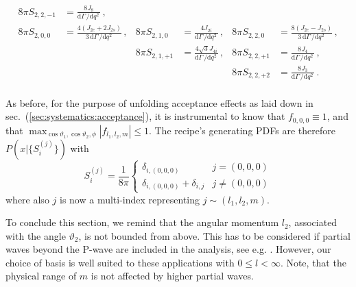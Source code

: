 \documentclass[aps,nofootinbib,preprintnumbers,prd,twocolumn]{revtex4-1}
\newcommand{\refsec}[1]{sec.~(\ref{sec:#1})}
\newcommand{\rmdx}[1]{\mbox{d} #1 \,} %
\renewcommand{\theta}{\vartheta}
\begin{document}
\begin{widetext}
\begin{equation}
\begin{aligned}
    8\pi S_{2, 2, -1} & = \frac{8 J_8}{\rmdx{\Gamma}/\rmdx{q^2}}\,,                                        \\
%
    8\pi S_{2, 0,  0} & = \frac{4 (J_{2c} + 2 J_{2s})}{3\, \rmdx{\Gamma}/\rmdx{q^2}}\,,                    &
    8\pi S_{2, 1,  0} & = \frac{4 J_{2i}}{\rmdx{\Gamma}/\rmdx{q^2}}\,,                                     &
    8\pi S_{2, 2,  0} & = \frac{8 (J_{2c} - J_{2s})}{3\, \rmdx{\Gamma}/\rmdx{q^2}}\,,                      \\
%
                      &                                                                                    &
    8\pi S_{2, 1, +1} & = \frac{4\sqrt{3} J_{4i}}{\rmdx{\Gamma}/\rmdx{q^2}}\,,                             &
    8\pi S_{2, 2, +1} & = \frac{8 J_{4}}{\rmdx{\Gamma}/\rmdx{q^2}}\,,                                      \\
%
                      &                                                                                    &
                      &                                                                                    &
    8\pi S_{2, 2, +2} & = \frac{8 J_3}{\rmdx{\Gamma}/\rmdx{q^2}}\,.                                        \\
\end{aligned}
\end{equation}
\end{widetext}

As before, for the purpose of unfolding acceptance effects as laid down in \refsec{systematics:acceptance}, it is instrumental
to know that $f_{0,0,0} \equiv 1$, and that $\max_{\cos\theta_1,\cos\theta_2,\phi} |f_{l_1, l_2, m}| \leq 1$.
The recipe's generating PDFs are therefore $P(x|\lbrace S_i^{(j)}\rbrace)$ with
\begin{equation}
    \label{eq:recipe:btokstarll}
    S_i^{(j)} = \frac{1}{8\pi}
        \begin{cases}
            \delta_{i,(0,0,0)}                  & j = (0, 0, 0)\\
            \delta_{i,(0,0,0)}  + \delta_{i,j}  & j \neq (0, 0, 0)
        \end{cases}
\end{equation}
where also $j$ is now a multi-index representing $j \sim (l_1, l_2, m)$.

To conclude this section, we remind that the angular momentum $l_2$, associated with the angle $\theta_2$, is not bounded from above.
This has to be considered if partial waves beyond the P-wave are included in the analysis, see e.g. \cite{Das:2014sra}.
However, our choice of basis is well suited to these applications with $0 \leq l < \infty$. Note, that the
physical range of $m$ is not affected by higher partial waves.\\
\end{document}
